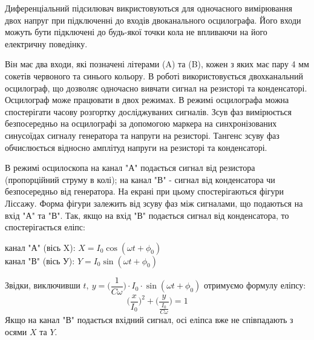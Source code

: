 \documentclass[a4paper,12pt]{article}
\begin{document}
    Диференціальний підсилювач викристовуються для одночасного вимірювання 
    двох напруг при підключенні до входів двоканального осцилографа. Його входи 
    можуть бути підключені до будь-якої точки кола не впливаючи на його електричну поведінку.

    Він має два входи, які позначені літерами (A) та (B), кожен з яких має пару 4 мм 
    сокетів червоного та синього кольору. В роботі використовується двохканальний 
    осцилограф, що дозволяє одночасно вивчати сигнал на резисторі та конденсаторі. 
    Осцилограф може працювати в двох режимах. В режимі осцилографа можна 
    спостерігати часову розгортку досліджуваних сигналів. Зсув фаз вимірюється 
    безпосередньо на осцилографі за допомогою маркера на синхронізованих 
    синусоїдах сигналу генератора та напруги на резисторі. Тангенс зсуву фаз 
    обчислюється відносно амплітуд напруги на резисторі та конденсаторі.

    В режимі осцилоскопа на канал "А" подається сигнал від резистора 
    (пропорційний струму в колі); на канал "В" - сигнал від конденсатора чи 
    безпосередньо від генератора. На екрані при цьому спостерігаються фігури Ліссажу. 
    Форма фігури залежить від зсуву фаз між сигналами, що подаються на вхід "А" та 
    "В". Так, якщо на вхід "В" подається сигнал від конденсатора, то спостерігається еліпс:
    \begin{center}
        канал "А" (вісь X): $X=I_0\cos(\omega t+\phi_0)$ \\
        канал "В" (вісь У): $Y=I_0\sin(\omega t+\phi_0)$
    \end{center}
    Звідки, виключивши $t,\: y=\biggl(\dfrac{1}{C\omega}\biggr)\cdot I_0\cdot\sin(\omega t+\phi_0)$ отримуємо формулу еліпсу:
    $$\biggl(\dfrac{x}{I_0}\biggr)^2+\biggl(\dfrac{y}{\frac{I_0}{C\omega}}\biggr)=1$$
    Якщо на канал "В" подається вхідний сигнал, осі еліпса вже не співпадають з осями $X$ та $Y$.
\end{document}
